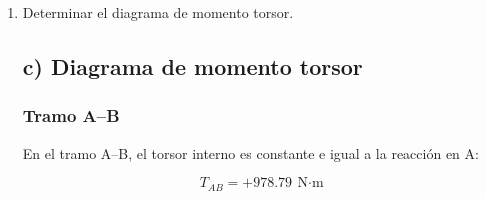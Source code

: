 \documentclass[12pt,a4paper]{article}
\begin{document}
\begin{enumerate}
\begin{equation}
T_A = 4.425\,T_C
\end{equation}

Sustituyendo en equilibrio:

\begin{equation}
4.425\,T_C + T_C = 1200
\end{equation}

\begin{equation}
5.425\,T_C = 1200
\end{equation}

\begin{equation}
\boxed{T_C = 221.21\ \text{N$\cdot$m}}
\end{equation}

Luego:

\begin{equation}
T_A = 1200 - 221.21 = 978.79\ \text{N$\cdot$m}
\end{equation}

\begin{equation}
\boxed{T_A = 978.79\ \text{N$\cdot$m}}
\end{equation}

\subsubsection*{Interpretación}

La reacción en A resulta mayor porque el tramo A--B posee mayor rigidez torsional, asociada a su mayor diámetro. Por ello, el reparto hiperestático de reacciones queda gobernado por la relación entre rigideces y no por una distribución uniforme del par.

\item[c)] Determinar el diagrama de momento torsor.

\subsection*{c) Diagrama de momento torsor}

\subsubsection*{Tramo A--B}

En el tramo A--B, el torsor interno es constante e igual a la reacción en A:

\begin{equation}
\boxed{T_{AB}=+978.79\ \text{N$\cdot$m}}
\end{equation}


\end{enumerate}
\end{document}

